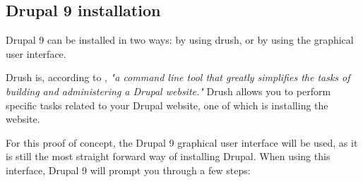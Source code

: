 \subsection{Drupal 9 installation}

Drupal 9 can be installed in two ways: by using drush, or by using the graphical user interface. 

Drush is, according to \textcite{Tomlinson2015}, \emph{"a command line tool that greatly simplifies the tasks of building and administering a Drupal website."} Drush allows you to perform specific tasks related to your Drupal website, one of which is installing the website.

For this proof of concept, the Drupal 9 graphical user interface will be used, as it is still the most straight forward way of installing Drupal. When using this interface, Drupal 9 will prompt you through a few steps:

